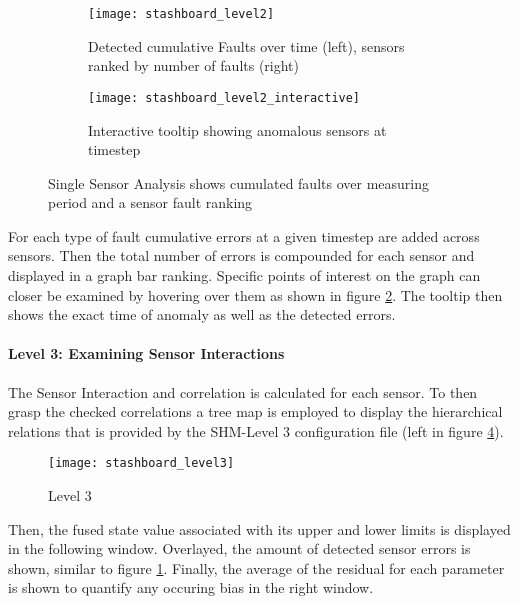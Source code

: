 \begin{figure}[!h]
    \centering
    \begin{subfigure}[b]{1\textwidth}
        \centering
        \texttt{[image: stashboard\_level2]}
        \caption{Detected cumulative Faults over time (left), sensors ranked by number of faults (right)}
        \label{fig:stashboard_level2_clean}
    \end{subfigure}
    \begin{subfigure}[b]{1\textwidth}
        \centering
        \texttt{[image: stashboard\_level2\_interactive]}
        \caption{Interactive tooltip showing anomalous sensors at timestep}
        \label{fig:stashboard_level2_interactive}
    \end{subfigure}
    \caption{Single Sensor Analysis shows cumulated faults over measuring period and a sensor fault ranking}
    \label{fig:stashboard_level2}
\end{figure}

For each type of fault cumulative errors at a given timestep are added across sensors. Then the total number of errors is compounded for each sensor and displayed in a graph bar ranking.
Specific points of interest on the graph can closer be examined by hovering over them as shown in figure \ref{fig:stashboard_level2_interactive}. The tooltip then shows the exact time of anomaly as well as the detected errors.


\paragraph{Level 3: Examining Sensor Interactions}

The Sensor Interaction and correlation is calculated for each sensor. To then grasp the checked correlations a tree map is employed to display the hierarchical relations that is provided by the SHM-Level 3 configuration file (left in figure \ref{fig:stashboard_level3}).

\begin{figure}
    \centering
    \texttt{[image: stashboard\_level3]}
    \caption{Level 3}
    \label{fig:stashboard_level3}
\end{figure}

Then, the fused state value associated with its upper and lower limits is displayed in the following window. Overlayed, the amount of detected sensor errors is shown, similar to figure \ref{fig:stashboard_level2_clean}. Finally, the average of the residual for each parameter is shown to quantify any occuring bias in the right window.


